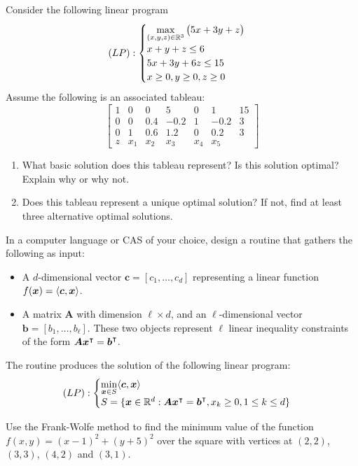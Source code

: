\begin{problem}[Intermediate]
Consider the following linear program
\begin{equation*}
(LP): \begin{cases}
\displaystyle{\max_{(x,y,z) \in \mathbb{R}^3} \big( 5x+3y+z \big)} \\
x+y+z \leq 6 \\
5x+3y+6z \leq 15 \\
x \geq 0, y \geq 0, z \geq 0
\end{cases}
\end{equation*}
Assume the following is an associated tableau:
\begin{equation*}
\begin{bmatrix}
1 &   0 &   0 &    5 &   0 &   1  & 15 \\
0 &   0 & 0.4 & -0.2 &   1 & -0.2 &  3 \\
0 &   1 & 0.6 &  1.2 &   0 &  0.2 &  3 \\ \hline
z & x_1 & x_2 &  x_3 & x_4 &  x_5  
\end{bmatrix}
\end{equation*}
\begin{enumerate}
\item What basic solution does this tableau represent? Is this solution optimal? Explain why or why not.
\item Does this tableau represent a unique optimal solution? If not, find at least three alternative optimal solutions.
\end{enumerate}
\end{problem}

\begin{problem}[CAS]
In a computer language or CAS of your choice, design a routine that gathers the following as input:
\begin{itemize}
	\item A $d$-dimensional vector $\boldsymbol{c}=[c_1, \dotsc, c_d]$ representing a linear function $f(\boldsymbol{x}) = \langle \boldsymbol{c}, \boldsymbol{x} \rangle$.
	\item A matrix $\boldsymbol{A}$ with dimension $\ell \times d$, and an $\ell$-dimensional vector $\boldsymbol{b} = [b_1, \dotsc, b_\ell]$.  These two objects represent $\ell$ linear inequality constraints of the form $\boldsymbol{A}{\boldsymbol{x}}^\intercal={\boldsymbol{b}}^\intercal$. 
\end{itemize}
The routine produces the solution of the following linear program:
\begin{equation*}
(LP): \begin{cases} \displaystyle{\min_{\boldsymbol{x}\in S} \langle \boldsymbol{c}, \boldsymbol{x}\rangle} \\ S = \{ \boldsymbol{x} \in \mathbb{R}^d : \boldsymbol{A}{\boldsymbol{x}}^\intercal={\boldsymbol{b}}^\intercal, x_k \geq 0, 1 \leq k \leq d \} \end{cases}
\end{equation*}
\end{problem}

\begin{problem}[Basic]
Use the Frank-Wolfe method to find the minimum value of the function $f(x,y)=(x-1)^2+(y+5)^2$ over the square with vertices at $(2,2)$, $(3,3)$, $(4,2)$ and $(3,1)$.
\end{problem}